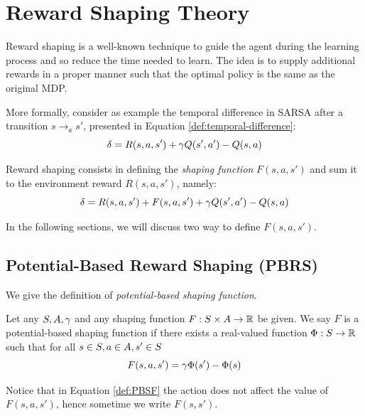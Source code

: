 \section{Reward Shaping Theory}
Reward shaping is a well-known technique to guide the agent during the learning process and so reduce the time needed to learn. The idea is to supply additional rewards in a proper manner such that the optimal policy is the same as the original MDP.

More formally, consider as example the temporal difference in SARSA after a transition $s \to_a s'$, presented in Equation \ref{def:temporal-difference}:
\begin{equation}
\delta = R(s,a,s') + \gamma Q(s', a') - Q(s, a)
\end{equation}

Reward shaping consists in defining the \emph{shaping function} $F(s,a,s')$ and sum it to the environment reward $R(s,a,s')$, namely:
\begin{equation}\label{eq:temporal-difference-reward-shaping}
\delta = R(s,a,s') + F(s,a,s') + \gamma Q(s', a') - Q(s, a)
\end{equation}

In the following sections, we will discuss two way to define $F(s,a,s')$. 

\subsection{Potential-Based Reward Shaping (PBRS)}\label{sect:PBRS}
We give the definition of \emph{potential-based shaping function}.
\begin{definition}\label{def:PBSF}
	Let any $S, A, \gamma$ and any shaping function $F: S\times A\to\mathbb{R}$ be given.
	We say $F$ is a potential-based shaping function if there exists a real-valued function $\Phi: S \to \mathbb{R}$ such that for all $s\in S, a\in A, s'\in S$
	\begin{equation}\label{eq:PBSF}
	F(s,a,s') = \gamma\Phi(s') - \Phi(s)
	\end{equation}
\end{definition}
Notice that in Equation \ref{def:PBSF} the action does not affect the value of $F(s,a,s')$, hence sometime we write $F(s,s')$.

